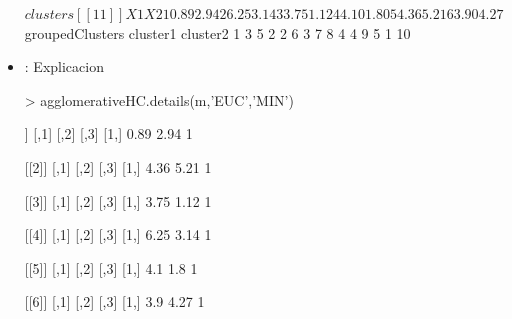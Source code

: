 \documentclass[a4paper, 12pt]{article}
\begin{document}
\begin{itemize}
\begin{Schunk}
\begin{Soutput}
$clusters[[11]]
    X1   X2
1 0.89 2.94
2 6.25 3.14
3 3.75 1.12
4 4.10 1.80
5 4.36 5.21
6 3.90 4.27


$groupedClusters
  cluster1 cluster2
1        3        5
2        2        6
3        7        8
4        4        9
5        1       10
\end{Soutput}
\end{Schunk}
		\item \texttt{}: 
		Explicacion
\begin{Schunk}
\begin{Sinput}
> agglomerativeHC.details(m,'EUC','MIN')
\end{Sinput}
\begin{Soutput}
[[1]]
     [,1] [,2] [,3]
[1,] 0.89 2.94    1

[[2]]
     [,1] [,2] [,3]
[1,] 4.36 5.21    1

[[3]]
     [,1] [,2] [,3]
[1,] 3.75 1.12    1

[[4]]
     [,1] [,2] [,3]
[1,] 6.25 3.14    1

[[5]]
     [,1] [,2] [,3]
[1,]  4.1  1.8    1

[[6]]
     [,1] [,2] [,3]
[1,]  3.9 4.27    1


\end{Soutput}
\end{Schunk}
\end{itemize}
\end{document}
